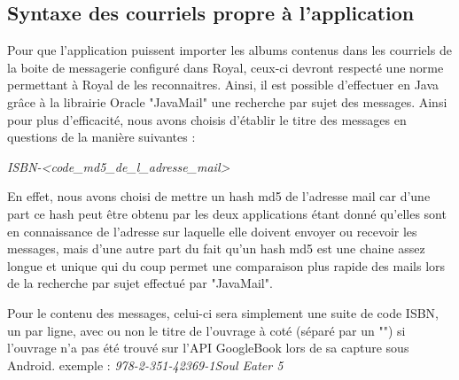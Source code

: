 \subsection{Syntaxe des courriels propre à l'application}

Pour que l'application puissent importer les albums contenus dans les courriels de la boite de messagerie configuré dans Royal, ceux-ci devront respecté une norme permettant à Royal de les reconnaitres.
Ainsi, il est possible d'effectuer en Java grâce à la librairie Oracle "JavaMail" une recherche par sujet des messages. Ainsi pour plus d'efficacité, nous avons choisis d'établir le titre des messages en questions de la manière suivantes :

\emph{ISBN-\textless code\_md5\_de\_l\_adresse\_mail\textgreater}

En effet, nous avons choisi de mettre un hash md5 de l'adresse mail car d'une part ce hash peut être obtenu par les deux applications étant donné qu'elles sont en connaissance de l'adresse sur laquelle elle doivent envoyer ou recevoir les messages, mais d'une autre part du fait qu'un hash md5 est une chaine assez longue et unique qui du coup permet une comparaison plus rapide des mails lors de la recherche par sujet effectué par "JavaMail".

Pour le contenu des messages, celui-ci sera simplement une suite de code ISBN, un par ligne, avec ou non le titre de l'ouvrage à coté (séparé par un "\textpipe") si l'ouvrage n'a pas été trouvé sur l'API GoogleBook lors de sa capture sous Android. exemple : \emph{978-2-351-42369-1\textpipe Soul Eater 5}



